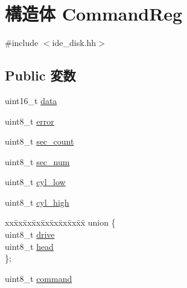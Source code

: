\hypertarget{structCommandReg}{
\section{構造体 CommandReg}
\label{structCommandReg}
}


{\ttfamily \#include $<$ide\_\-disk.hh$>$}\subsection*{Public 変数}
\begin{DoxyCompactItemize}
\item 
uint16\_\-t \hyperlink{structCommandReg_aa6e451eccf9519b0809baad41f5ab241}{data}
\item 
uint8\_\-t \hyperlink{structCommandReg_adc64ccb7538429fe78e3fe0139267370}{error}
\item 
uint8\_\-t \hyperlink{structCommandReg_a2b7ca3bc768d3d472ebf8dcc6d7b5588}{sec\_\-count}
\item 
uint8\_\-t \hyperlink{structCommandReg_a3940c6ebbd3db04528668419e3569c78}{sec\_\-num}
\item 
uint8\_\-t \hyperlink{structCommandReg_ab766960269178a004098748902b2b456}{cyl\_\-low}
\item 
uint8\_\-t \hyperlink{structCommandReg_a0b9715d01f574b6b31ac724f2039f8db}{cyl\_\-high}
\item 
\begin{tabbing}
xx\=xx\=xx\=xx\=xx\=xx\=xx\=xx\=xx\=\kill
union \{\\
\>uint8\_t \hyperlink{structCommandReg_a3f7026e41497f11cac6febb94464474c}{drive}\\
\>uint8\_t \hyperlink{structCommandReg_a9794c0e61506b826b49b458708ae2489}{head}\\
\}; \\

\end{tabbing}\item 
uint8\_\-t \hyperlink{structCommandReg_a1a5aaa930940857f68f245eeb89506b5}{command}
\end{DoxyCompactItemize}


